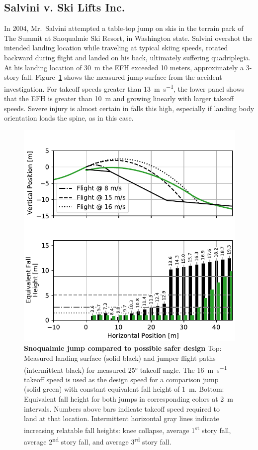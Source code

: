 \documentclass[smallextended]{svjour3}       %
\begin{document}
\subsection{Salvini v. Ski Lifts Inc.}
\label{sec:salvini}
%
In 2004, Mr.~Salvini attempted a table-top jump on skis in the terrain park of
The Summit at Snoqualmie Ski Resort, in Washington state. Salvini overshot the
intended landing location while traveling at typical skiing speeds, rotated
backward during flight and landed on his back, ultimately suffering
quadriplegia. At his landing location of 30~\si{\meter} the EFH exceeded 10
meters, approximately a 3-story fall.  Figure~\ref{fig:salvini-v-snoqualmie}
shows the measured jump surface from the accident investigation.  For takeoff
speeds greater than 13~\si{\meter\per\second}, the lower panel shows that the
EFH is greater than 10~\si{\meter} and growing linearly with larger takeoff
speeds. Severe injury is almost certain in falls this high, especially if
landing body orientation loads the spine, as in this case.
%
\begin{figure}
  \centering
  \includegraphics[width=\columnwidth]{figures/salvini-v-snoqualmie.pdf}
  \caption{\textbf{Snoqualmie jump compared to possible safer design}
  Top: Measured landing surface (solid black) and jumper flight paths
  (intermittent black) for measured 25\si{\degree} takeoff angle. The
  16~\si{\meter\per\second} takeoff speed is used as the design speed for a
  comparison jump (solid green) with constant equivalent fall height of
  1~\si{\meter}.
  Bottom: Equivalent fall height for both jumps in corresponding colors at
  2~\si{\meter} intervals. Numbers above bars indicate takeoff speed required
  to land at that location.
  Intermittent horizontal gray lines indicate increasing relatable fall
  heights: knee collapse, average 1\textsuperscript{st} story fall, average
  2\textsuperscript{nd} story fall, and average 3\textsuperscript{rd} story
  fall.
  }
  \label{fig:salvini-v-snoqualmie}
\end{figure}
\end{document}
